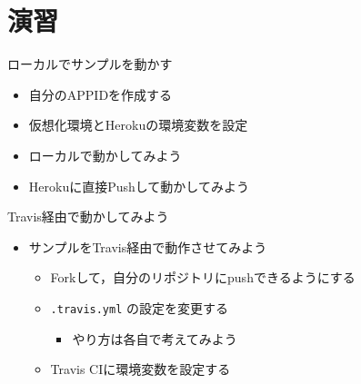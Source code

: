 \documentclass[t]{beamer}
\begin{document}
\section{演習}
\label{sec-4}
\begin{frame}[label=sec-4-1]{ローカルでサンプルを動かす}
\begin{itemize}
\item 自分のAPPIDを作成する
\item 仮想化環境とHerokuの環境変数を設定
\item ローカルで動かしてみよう
\item Herokuに直接Pushして動かしてみよう
\end{itemize}
\end{frame}
\begin{frame}[fragile,label=sec-4-2]{Travis経由で動かしてみよう}
 \begin{itemize}
\item サンプルをTravis経由で動作させてみよう
\begin{itemize}
\item Forkして，自分のリポジトリにpushできるようにする
\item \texttt{.travis.yml} の設定を変更する
\begin{itemize}
\item やり方は各自で考えてみよう
\end{itemize}
\item Travis CIに環境変数を設定する
\end{itemize}
\end{itemize}
\end{frame}
\end{document}
